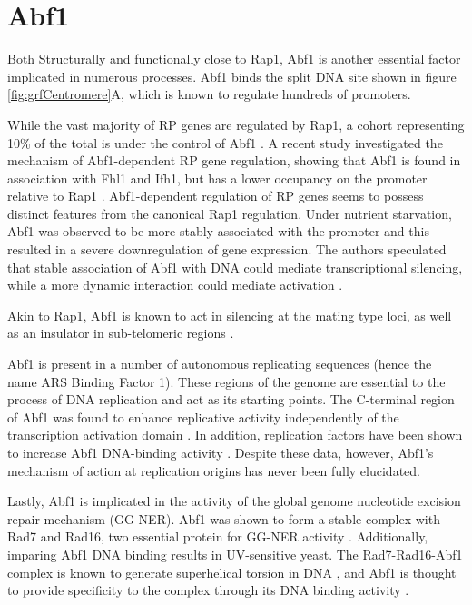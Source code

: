 \section{Abf1}

Both Structurally and functionally close to Rap1, Abf1 is another essential factor implicated in numerous processes. 
Abf1 binds the split DNA site shown in figure \ref{fig:grfCentromere}A, which is known to regulate hundreds of promoters. 

While the vast majority of RP genes are regulated by Rap1, a cohort representing 10\% of the total is under the control of Abf1 \cite{dellaseta:1990:abf1}. 
A recent study investigated the mechanism of Abf1-dependent RP gene regulation, showing that Abf1 is found in association with Fhl1 and Ifh1, but has a lower occupancy on the promoter relative to Rap1 \cite{fermi:2016:multiple}. 
Abf1-dependent regulation of RP genes seems to possess distinct features from the canonical Rap1 regulation. 
Under nutrient starvation, Abf1 was observed to be more stably associated with the promoter and this resulted in a severe downregulation of gene expression. 
The authors speculated that stable association of Abf1 with DNA could mediate transcriptional silencing, while a more dynamic interaction could mediate activation \cite{fermi:2016:promoter}.

Akin to Rap1, Abf1 is known to act in silencing at the mating type loci, as well as an insulator in sub-telomeric regions \cite{mak:2009:dynamic}. 

Abf1 is present in a number of autonomous replicating sequences (hence the name ARS Binding Factor 1). 
These regions of the genome are essential to the process of DNA replication and act as its starting points.
The C-terminal region of Abf1 was found to enhance replicative activity independently of the transcription activation domain \cite{wiltshire:1997:abf1p}. 
In addition, replication factors have been shown to increase Abf1 DNA-binding activity \cite{feng:1998:saccharomyces}. 
Despite these data, however, Abf1’s mechanism of action at replication origins has never been fully elucidated.

Lastly, Abf1 is implicated in the activity of the global genome nucleotide excision repair mechanism (GG-NER). 
Abf1 was shown to form a stable complex with Rad7 and Rad16, two essential protein for GG-NER activity  \cite{reed:1999:yeast}. 
Additionally, imparing Abf1 DNA binding results in UV-sensitive yeast. 
The Rad7-Rad16-Abf1 complex is known to generate superhelical torsion in DNA \cite{yu:2004:yeast}, and Abf1 is thought to provide specificity to the complex through its DNA binding activity \cite{Yu:2009:abf1binding}.


